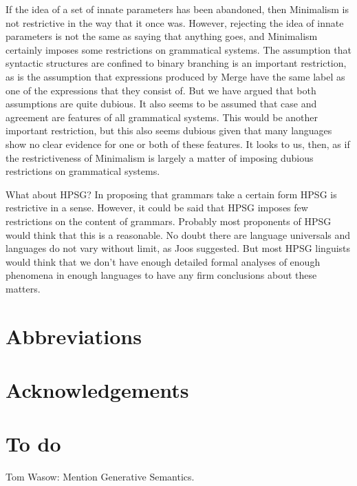 \documentclass[output=paper]{langsci/langscibook}
\begin{document}
If the idea of a set of innate parameters has been abandoned, then Minimalism is not restrictive in the way that it once was. However, rejecting the idea of innate parameters is not the same as saying that anything goes, and Minimalism certainly imposes some restrictions on grammatical systems. The assumption that syntactic structures are confined to binary branching is an important restriction, as is the assumption that expressions produced by Merge have the same label as one of the expressions that they consist of. But we have argued that both assumptions are quite dubious. It also seems to be assumed that case and agreement are features of all grammatical systems. This would be another important restriction, but this also seems dubious given that many languages show no clear evidence for one or both of these features. It looks to us, then, as if the restrictiveness of Minimalism is largely a matter of imposing dubious restrictions on grammatical systems.

What about HPSG? In proposing that grammars take a certain form HPSG is restrictive in a sense. However, it could be said that HPSG imposes few restrictions on the content of grammars. Probably most proponents of HPSG would think that this is a reasonable. No doubt there are language universals and languages do not vary without limit, as Joos suggested. But most HPSG linguists would think that we don't have enough detailed formal analyses of enough phenomena in enough languages to have any firm conclusions about these matters.


\section*{Abbreviations}
\section*{Acknowledgements}

\section{To do}


Tom Wasow: Mention Generative Semantics.

\printbibliography[heading=subbibliography,notkeyword=this] 
\end{document}

